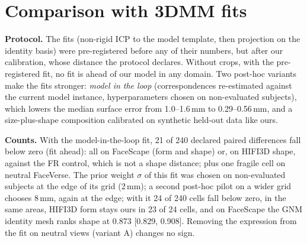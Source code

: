 \documentclass[10pt,twocolumn,letterpaper]{article}
\begin{document}
\begin{table}[t]
  \centering
  \scriptsize
  \caption{Boundary crops, FR (spearman\_e3.csv). ``all'': all cross-discretization pairs; ``crop rows'': pairs that involve a crop.}
  \label{tab:crop_fr}
  \resizebox{\textwidth}{!}{}
\end{table}

\begin{table}[t]
  \centering
  \scriptsize
  \caption{Boundary crops, SR.}
  \label{tab:crop_sr}
  \resizebox{\textwidth}{!}{}
\end{table}

\FloatBarrier
\section{Comparison with 3DMM fits}
\label{sec:fits}
\textbf{Protocol.} The fits (non-rigid ICP to the model template, then projection on the identity basis) were pre-registered before any of their numbers, but after our calibration, whose distance the protocol declares. Without crops, with the pre-registered fit, no fit is ahead of our model in any domain. Two post-hoc variants make the fits stronger: \emph{model in the loop} (correspondences re-estimated against the current model instance, hyperparameters chosen on non-evaluated subjects), which lowers the median surface error from 1.0--1.6\,mm to 0.29--0.56\,mm, and a size-plus-shape composition calibrated on synthetic held-out data like ours.

\textbf{Counts.} With the model-in-the-loop fit, 21 of 240 declared paired differences fall below zero (fit ahead): all on FaceScape (form and shape) or, on HIFI3D shape, against the FR control, which is not a shape distance; plus one fragile cell on neutral FaceVerse. The prior weight $\sigma$ of this fit was chosen on non-evaluated subjects at the edge of its grid (2\,mm); a second post-hoc pilot on a wider grid chooses 8\,mm, again at the edge; with it 24 of 240 cells fall below zero, in the same areas, HIFI3D form stays ours in 23 of 24 cells, and on FaceScape the GNM identity mesh ranks shape at 0.873 [0.829, 0.908]. Removing the expression from the fit on neutral views (variant A) changes no sign.
\end{document}
